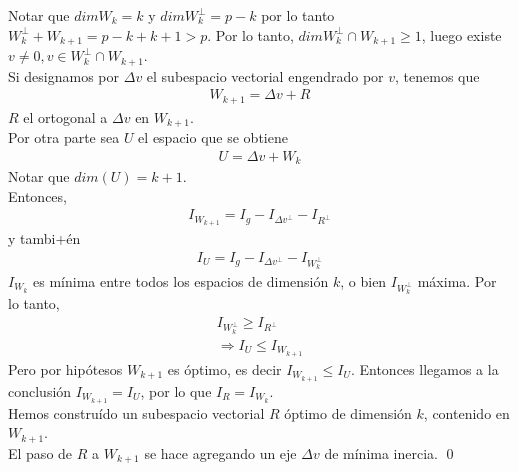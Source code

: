 \documentclass[10pt]{article}
\theoremstyle{plain}
\renewenvironment{proof}{{\bfseries \noindent Demostración}}{ \qed \\}
\theoremstyle{definition}
\begin{document}
\begin{proof}
Notar que $dim W_{k} = k$ y $dim W_{k}^{\perp} = p-k$ por lo tanto $W_{k}^{\perp} + W_{k+1} = p-k + k + 1 > p$. Por lo tanto, $dim W_{k}^{\perp}\cap W_{k+1} \ge 1$, luego existe $v \not = 0, v \in W_{k}^{\perp} \cap W_{k+1}$.\\

Si designamos por $\Delta v$ el subespacio vectorial engendrado por $v$, tenemos que
\begin{align*}
W_{k+1} = \Delta v + R
\end{align*}
$R$ el ortogonal a $\Delta v$ en $W_{k+1}$.\\

Por otra parte sea $U$ el espacio que se obtiene
\begin{align*}
U = \Delta v + W_{k}
\end{align*}
Notar que $dim(U) = k+1$.\\

Entonces,
\begin{align*}
I_{W_{k+1}} = I_{g} - I_{\Delta v ^{\perp}} - I_{R^{\perp}}
\end{align*}
y tambi+én
\begin{align*}
I_{U} = I_{g} - I_{\Delta v ^{\perp}} - I_{W_{k}^{\perp}}
\end{align*}
$I_{W_{k}}$ es mínima entre todos los espacios de dimensión $k$, o bien $I_{W_{k}^{\perp}}$ máxima. Por lo tanto,
\begin{align*}
I_{W_{k}^{\perp}} \ge I_{R^{\perp}}\\
\Rightarrow I_{U} \le I_{W_{k+1}}
\end{align*}
Pero por hipótesos $W_{k+1}$ es óptimo, es decir $I_{W_{k+1}} \le I_{U}$. Entonces llegamos a la conclusión $I_{W_{k+1}} = I_{U}$, por lo que $I_{R} = I_{W_{k}}$.\\

Hemos construído un subespacio vectorial $R$ óptimo de dimensión $k$, contenido en $W_{k+1}$.\\

El paso de  $R$ a $W_{k+1}$ se hace agregando un eje $\Delta v$ de mínima inercia.
\end{proof}
\end{document}
